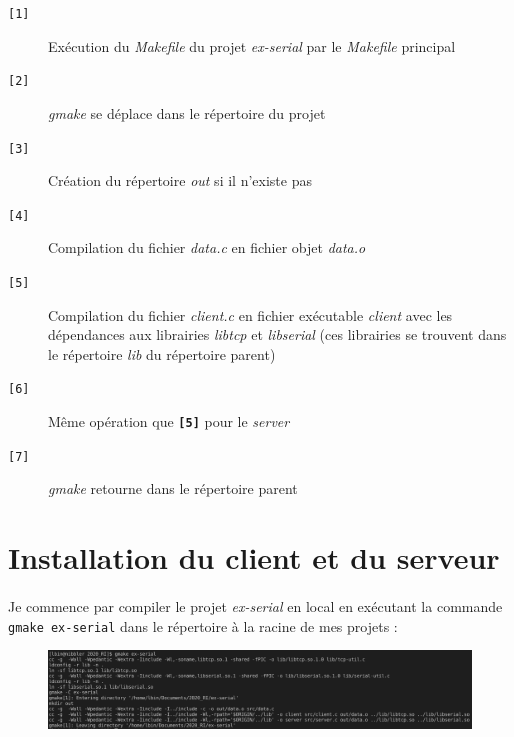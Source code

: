 \documentclass{article}
\begin{document}
    \begin{description}
        \item[\texttt{[1]} ] Exécution du \emph{Makefile} du projet \emph{ex-serial} par le \emph{Makefile} principal
        \item[\texttt{[2]} ] \emph{gmake} se déplace dans le répertoire du projet
        \item[\texttt{[3]} ] Création du répertoire \emph{out} si il n'existe pas
        \item[\texttt{[4]} ] Compilation du fichier \emph{data.c} en fichier objet \emph{data.o}
        \item[\texttt{[5]} ] Compilation du fichier \emph{client.c} en fichier exécutable \emph{client} avec les dépendances aux librairies \emph{libtcp} et \emph{libserial} (ces librairies se trouvent dans le répertoire \emph{lib} du répertoire parent)
        \item[\texttt{[6]} ] Même opération que \textbf{\texttt{[5]}} pour le \emph{server}
        \item[\texttt{[7]} ] \emph{gmake} retourne dans le répertoire parent
    \end{description}


    \section{Installation du client et du serveur}
    \paragraph{}
    Je commence par compiler le projet \emph{ex-serial} en local en exécutant la commande \texttt{gmake ex-serial} dans le répertoire à la racine de mes projets :
    \begin{figure}[H]
        \centering
        \includegraphics[width=\linewidth]{./screenshots/compilation.png}
    \end{figure}

    \newpage
\end{document}
